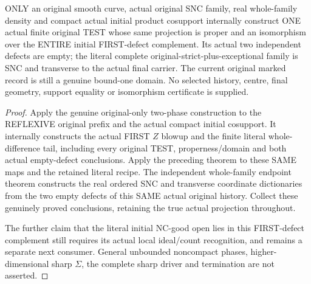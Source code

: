 \begin{theorem}
\label{hir:sharp-original-curve-two-phase-transverse-isomorphism-producer}
\leanok
ONLY an original smooth curve, actual original SNC family, real
whole-family density and compact actual initial product cosupport
internally construct ONE actual finite original TEST whose same
projection is proper and an isomorphism over the ENTIRE initial
FIRST-defect complement. Its actual two independent defects are empty;
the literal complete original-strict-plus-exceptional family is SNC
and transverse to the actual final carrier. The current original
marked record is still a genuine bound-one domain. No selected history,
centre, final geometry, support equality or isomorphism certificate is
supplied.
\end{theorem}
\begin{proof}
Apply the genuine original-only two-phase construction to the
REFLEXIVE original prefix and the actual compact initial cosupport.
It internally constructs the actual FIRST $Z$ blowup and the finite
literal whole-difference tail, including every original TEST,
properness/domain and both actual empty-defect conclusions. Apply the
preceding theorem to these SAME maps and the retained literal recipe.
The independent whole-family endpoint theorem constructs the real
ordered SNC and transverse coordinate dictionaries from the two empty
defects of this SAME actual original history. Collect these genuinely
proved conclusions, retaining the true actual projection throughout.

The further claim that the literal initial NC-good open lies in this
FIRST-defect complement still requires its actual local ideal/count
recognition, and remains a separate next consumer. General unbounded
noncompact phases, higher-dimensional sharp $\Sigma$, the complete
sharp driver and termination are not asserted.
\end{proof}
